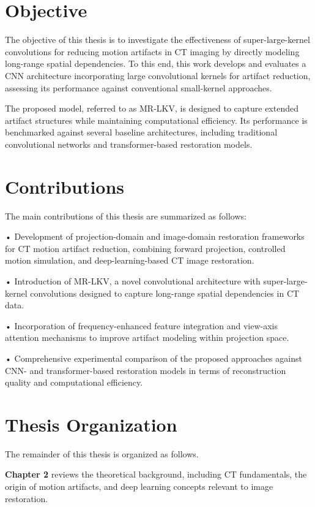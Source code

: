 \section{Objective}


The objective of this thesis is to investigate the effectiveness of super-large-kernel convolutions for reducing motion artifacts in CT imaging by directly modeling long-range spatial dependencies. 
To this end, this work develops and evaluates a CNN architecture incorporating large convolutional kernels for artifact reduction, assessing its performance against conventional small-kernel approaches.\

The proposed model, referred to as MR-LKV, is designed to capture extended artifact structures while maintaining computational efficiency. Its performance is benchmarked against several baseline architectures, including traditional convolutional networks and transformer-based restoration models.
\clearpage
\section{Contributions}
The main contributions of this thesis are summarized as follows:

• Development of projection-domain and image-domain restoration frameworks for CT motion artifact reduction,  combining forward projection, controlled motion simulation, and deep-learning-based CT image restoration.

• Introduction of MR-LKV, a novel convolutional architecture with super-large-kernel convolutions designed to capture long-range spatial dependencies in CT data.


• Incorporation of frequency-enhanced feature integration and view-axis attention mechanisms to improve artifact modeling within projection space.


• Comprehensive experimental comparison of the proposed approaches against CNN- and transformer-based restoration models in terms of reconstruction quality and computational efficiency.

\section{Thesis Organization}

The remainder of this thesis is organized as follows.

\textbf{Chapter 2 }reviews the theoretical background, including CT fundamentals, the origin of motion artifacts, and deep learning concepts relevant to image restoration. 

